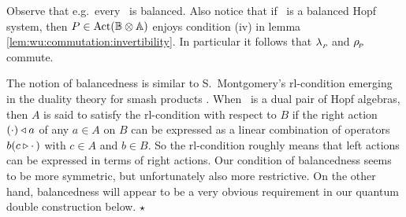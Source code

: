 Observe that e.g.\ every \mhs\ is balanced.
Also notice that if \pairAB\ is a balanced Hopf system,
then $P\in \mbox{\rm Act}(\mathbb{B} \otimes \mathbb{A})$ enjoys condition (iv) in
lemma \ref{lem:wu:commutation:invertibility}\@.
In particular it follows that $\lambda_{_P\!}$ and $\rho_{_{\!P}}$ commute.

\begin{remark} \rm
The notion of balancedness is similar to S.\ Montgomery's \mbox{{\sc rl}-condition}
emerging in the duality theory for smash products \cite[\S 9.4]{Montgomery}\@.
When \pairAB\ is a dual pair of Hopf algebras, then $A$ is said to satisfy the
{\sc rl}-condition with respect to $B$ if the right action $(\cdot) \triangleleft a$
of any $a\in A$ on $B$ can be expressed as a linear combination of operators
$b(c \triangleright \cdot\,)$ with $c\in A$ and $b\in B$.
So the {\sc rl}-condition roughly means that left actions can be expressed
in terms of right actions.
Our condition of balancedness seems to be more symmetric, but unfortunately also
more restrictive.
On the other hand, balancedness will appear to be a very obvious requirement in our
quantum double construction below.
\hfill $\star$
\end{remark}
